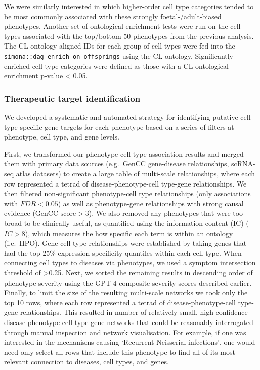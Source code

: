 \documentclass[
]{article}
\begin{document}
We were similarly interested in which higher-order cell type categories
tended to be most commonly associated with these strongly
foetal-/adult-biased phenotypes. Another set of ontological enrichment
tests were run on the cell types associated with the top/bottom 50
phenotypes from the previous analysis. The CL ontology-aligned IDs for
each group of cell types were fed into the
\texttt{simona::dag\_enrich\_on\_offsprings} using the CL ontology.
Significantly enriched cell type categories were defined as those with a
CL ontological enrichment p-value \textless{} 0.05.

\subsubsection{Therapeutic target
identification}\label{therapeutic-target-identification}

We developed a systematic and automated strategy for identifying
putative cell type-specific gene targets for each phenotype based on a
series of filters at phenotype, cell type, and gene levels.

First, we transformed our phenotype-cell type association results and
merged them with primary data sources (e.g.~GenCC gene-disease
relationships, scRNA-seq atlas datasets) to create a large table of
multi-scale relationships, where each row represented a tetrad of
disease-phenotype-cell type-gene relationships. We then filtered
non-significant phenotype-cell type relationships (only associations
with \(FDR<0.05\)) as well as phenotype-gene relationships with strong
causal evidence (\(\text{GenCC score}>3\)). We also removed any
phenotypes that were too broad to be clinically useful, as quantified
using the information content (IC) (\(IC>8\)), which measures the how
specific each term is within an ontology (i.e.~HPO). Gene-cell type
relationships were established by taking genes that had the top 25\%
expression specificity quantiles within each cell type. When connecting
cell types to diseases via phenotypes, we used a symptom intersection
threshold of \textgreater0.25. Next, we sorted the remaining results in
descending order of phenotype severity using the GPT-4 composite
severity scores described earlier. Finally, to limit the size of the
resulting multi-scale networks we took only the top 10 rows, where each
row represented a tetrad of disease-phenotype-cell type-gene
relationships. This resulted in number of relatively small,
high-confidence disease-phenotype-cell type-gene networks that could be
reasonably interrogated through manual inspection and network
visualisation. For example, if one was interested in the mechanisms
causing `Recurrent Neisserial infections', one would need only select
all rows that include this phenotype to find all of its most relevant
connection to diseases, cell types, and genes.
\end{document}
